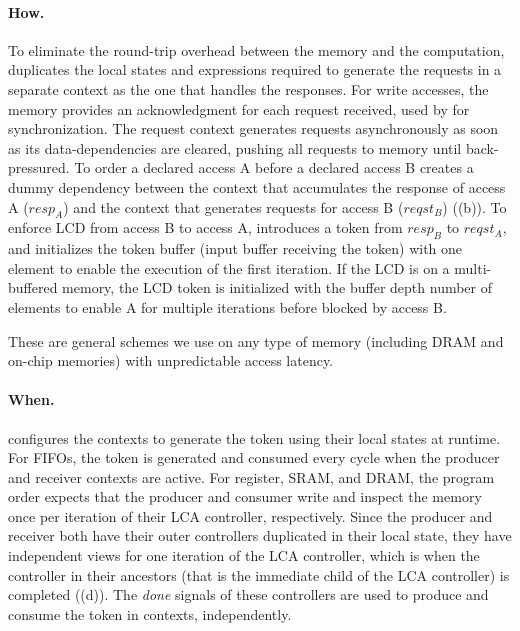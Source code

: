 \paragraph{How.} 

To eliminate the round-trip overhead between the memory and the computation, 
\name{} duplicates the local states and expressions required to generate the requests in a separate context as the one that handles the responses.
For write accesses, the memory provides an acknowledgment for each request received, used by \name for synchronization.
The request context generates requests asynchronously as soon as its data-dependencies are cleared, pushing all requests to memory until back-pressured.
To order a declared access A before a declared access B
\name creates a dummy dependency between the context that accumulates the response of access A ($resp_A$) and the context that generates requests for access B ($reqst_B$) ((b)).
To enforce LCD from access B to access A, \name introduces a token from $resp_B$ to $reqst_A$, and initializes the token buffer (input buffer receiving the token) with one element to enable the execution of the first iteration.
If the LCD is on a multi-buffered memory, the LCD token is initialized with the buffer depth number of elements to enable A for multiple iterations before blocked by access B.

These are general schemes we use on any type of memory (including DRAM and on-chip memories) with unpredictable access latency.

\paragraph{When.}
\name{} configures the contexts to generate the token using their local states at runtime.
For FIFOs, the token is generated and consumed every cycle when the producer and receiver contexts are active.
For register, SRAM, and DRAM, the program order expects that the producer and consumer write and inspect the memory once per iteration of their LCA controller, respectively.
Since the producer and receiver both have their outer controllers duplicated in their local state, they have independent views for one iteration of the LCA controller, which is when the controller in their ancestors (that is the immediate child of the LCA controller) is completed ((d)).
The {\em done} signals of these controllers are used to produce and consume the token in contexts, independently.

